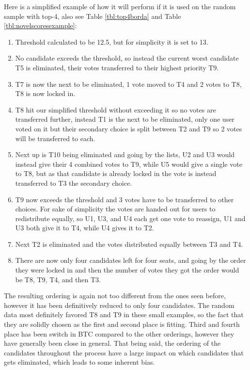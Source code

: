 Here is a simplified example of how it will perform if it is used on the random sample with top-4, also see Table \ref{tbl:top4borda} and Table \ref{tbl:novelscoresexample}:

\begin{enumerate}
	\item Threshold calculated to be 12.5, but for simplicity it is set to 13.
	\item No candidate exceeds the threshold, so instead the current worst candidate T5 is eliminated, their votes transferred to their highest priority T9.
	\item T7 is now the next to be eliminated, 1 vote moved to T4 and 2 votes to T8, T8 is now locked in.
	\item T8 hit our simplified threshold without exceeding it so no votes are transferred further, instead T1 is the next to be eliminated, only one user voted on it but their secondary choice is split between T2 and T9 so 2 votes will be transferred to each.
	\item Next up is T10 being eliminated and going by the lists, U2 and U3 would instead give their 4 combined votes to T9, while U5 would give a single vote to T8, but as that candidate is already locked in the vote is instead transferred to T3 the secondary choice.
	\item T9 now exceeds the threshold and 3 votes have to be transferred to other choices. For sake of simplicity the votes are handed out for users to redistribute equally, so U1, U3, and U4 each get one vote to reassign, U1 and U3 both give it to T4, while U4 gives it to T2.
	\item Next T2 is eliminated and the votes distributed equally between T3 and T4.
	\item There are now only four candidates left for four seats, and going by the order they were locked in and then the number of votes they got the order would be T8, T9, T4, and then T3.
\end{enumerate}

The resulting ordering is again not too different from the ones seen before, however it has been definitively reduced to only four candidates. The random data most definitely favored T8 and T9 in these small examples, so the fact that they are solidly chosen as the first and second place is fitting. Third and fourth place has been switch in BTC compared to the other orderings, however they have generally been close in general. That being said, the ordering of the candidates throughout the process have a large impact on which candidates that gets eliminated, which leads to some inherent bias.

